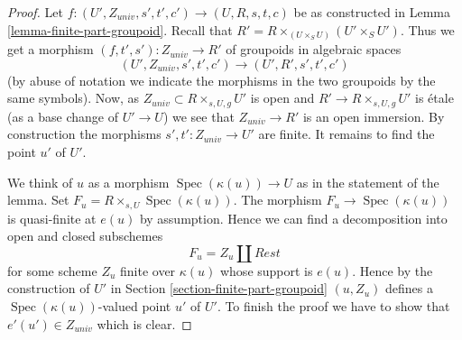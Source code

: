 \documentclass{stacks-project}
\theoremstyle{plain}
\theoremstyle{definition}
\theoremstyle{remark}
\numberwithin{equation}{subsection}
\def\Spec{\mathop{\mathrm{Spec}}}
\begin{document}
\begin{proof}
Let $f : (U', Z_{univ}, s', t', c') \to (U, R, s, t, c)$ be as constructed in
Lemma \ref{lemma-finite-part-groupoid}.
Recall that $R' = R \times_{(U \times_S U)} (U' \times_S U')$.
Thus we get a morphism $(f, t', s') : Z_{univ} \to R'$ of groupoids
in algebraic spaces
$$
(U', Z_{univ}, s', t', c') \to (U', R', s', t', c')
$$
(by abuse of notation we indicate the morphisms in the two groupoids
by the same symbols). Now, as $Z_{univ} \subset R \times_{s, U, g} U'$ is open
and $R' \to R \times_{s, U, g} U'$ is \'etale (as a base change
of $U' \to U$) we see that $Z_{univ} \to R'$ is an open immersion.
By construction the morphisms $s', t' : Z_{univ} \to U'$ are finite.
It remains to find the point $u'$ of $U'$.

\medskip\noindent
We think of $u$ as a morphism $\Spec(\kappa(u)) \to U$ as in
the statement of the lemma. Set $F_u = R \times_{s, U} \Spec(\kappa(u))$.
The morphism $F_u \to \Spec(\kappa(u))$ is quasi-finite at $e(u)$
by assumption. Hence we can find a decomposition into open and closed
subschemes
$$
F_u = Z_u \amalg Rest
$$
for some scheme $Z_u$ finite over $\kappa(u)$ whose support is $e(u)$.
Hence by the construction of $U'$ in
Section \ref{section-finite-part-groupoid}
$(u, Z_u)$ defines a $\Spec(\kappa(u))$-valued
point $u'$ of $U'$. To finish the proof we have to show that
$e'(u') \in Z_{univ}$ which is clear.
\end{proof}
\end{document}
